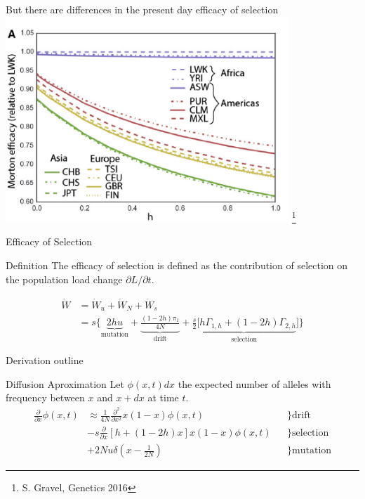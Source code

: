 \documentclass[10pt]{beamer}
\newcommand{\del}[1]{\ensuremath{\frac{\partial}{\partial #1}}}
\newcommand{\dell}[1]{\ensuremath{\frac{\partial^2}{\partial #1^2}}}
\begin{document}
\begin{frame}{\normalsize But there are differences in the present day efficacy
    of selection} 
  \vfill
  \centering
  \includegraphics[width=0.8\textwidth]{./Figures/Gravel_efsel.png}
  \let\thefootnote\relax\footnote{S. Gravel, Genetics 2016}
\end{frame}

\begin{frame}{Efficacy of Selection}
  \begin{alertblock}{Definition}
    The efficacy of selection is defined as the contribution of selection on
    the population load change $\partial L / \partial t$.  
  \end{alertblock}
  \begin{align}
    \dot W &= \dot W_u + \dot W_N + \dot W_s
    \nonumber \\
    &= s \big\{
    \underbrace{2hu}_\text{mutation} + 
    \underbrace{\frac{(1 - 2h)\pi_1}{4N}}_\text{drift} + 
    \underbrace{\frac{s}{2}[h\Gamma_{1,h}+(1-2h)\Gamma_{2,h}}_\text{selection}]
      \big\}
  \end{align}
\end{frame}

\begin{frame}{Derivation outline}
  \begin{block}{Diffusion Aproximation}
    Let $\phi(x,t)dx$ the expected number of alleles with frequency between $x$
    and $x + dx$ at time $t$.
    \begin{align}
      \del x \phi(x,t) & \approx \frac{1}{4N} \dell x x(1-x) \phi(x,t) 
      & &\bigg\} \mathrm{drift}
      \nonumber \\ 
      &- s \del x [h + ( 1 - 2h)x]x(1-x) \phi(x,t) 
      & &\bigg\} \mathrm{selection}
      \nonumber \\
      &+ 2Nu\delta\left( x - \frac{1}{2N}\right)
      & &\bigg\} \mathrm{mutation}
    \end{align}
  \end{block}
\end{frame}
\end{document}

